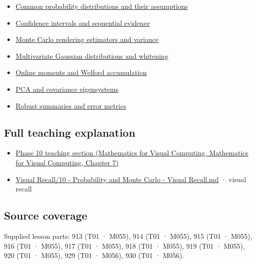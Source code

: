\begin{itemize}
\tightlist
\item
  \hyperref[appendix-a2360b435383]{Common probability distributions and their assumptions}
\item
  \hyperref[appendix-c83016554b1e]{Confidence intervals and sequential evidence}
\item
  \hyperref[appendix-031e02bf28af]{Monte Carlo rendering estimators and variance}
\item
  \hyperref[appendix-12bbe185dbe5]{Multivariate Gaussian distributions and whitening}
\item
  \hyperref[appendix-33237f0f618b]{Online moments and Welford accumulation}
\item
  \hyperref[appendix-ad175ef3c5bf]{PCA and covariance eigensystems}
\item
  \hyperref[appendix-bcc44e9d3d02]{Robust summaries and error metrics}
\end{itemize}

\subsection{Full teaching explanation}\label{appendix-54c383df9992-full-teaching-explanation}

\begin{itemize}
\tightlist
\item
  \href{../02-Mathematics-for-Visual-Computing/main.pdf\#nameddest=02-foundations-ii-ch023-expected-values-describe-centers-covariance-describes-dependence}{Phase 10 teaching section (Mathematics for Visual Computing, Mathematics for Visual Computing, Chapter 7)}
\item
  \hyperref[appendix-cb5af353ef77]{Visual Recall/10 - Probability and Monte Carlo - Visual Recall.md} · visual recall
\end{itemize}

\subsection{Source coverage}\label{appendix-54c383df9992-source-coverage}

Supplied lesson parts: 913 (T01 · M055), 914 (T01 · M055), 915 (T01 · M055), 916 (T01 · M055), 917 (T01 · M055), 918 (T01 · M055), 919 (T01 · M055), 920 (T01 · M055), 929 (T01 · M056), 930 (T01 · M056).

